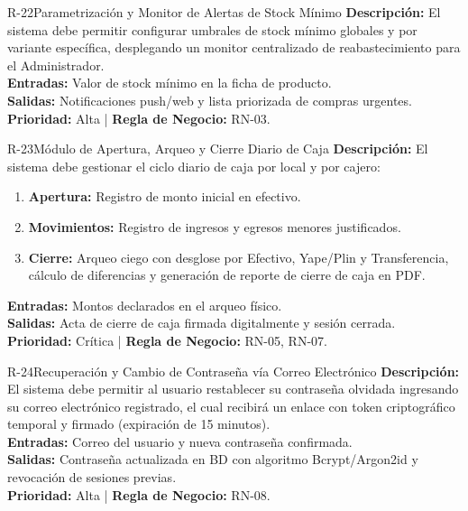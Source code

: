 \begin{reqbox}{R-22}{Parametrización y Monitor de Alertas de Stock Mínimo}
\textbf{Descripción:} El sistema debe permitir configurar umbrales de stock mínimo globales y por variante específica, desplegando un monitor centralizado de reabastecimiento para el Administrador.\\
\textbf{Entradas:} Valor de stock mínimo en la ficha de producto.\\
\textbf{Salidas:} Notificaciones push/web y lista priorizada de compras urgentes.\\
\textbf{Prioridad:} Alta | \textbf{Regla de Negocio:} RN-03.
\end{reqbox}

\begin{reqbox}{R-23}{Módulo de Apertura, Arqueo y Cierre Diario de Caja}
\textbf{Descripción:} El sistema debe gestionar el ciclo diario de caja por local y por cajero:
\begin{enumerate}[noitemsep]
    \item \textbf{Apertura:} Registro de monto inicial en efectivo.
    \item \textbf{Movimientos:} Registro de ingresos y egresos menores justificados.
    \item \textbf{Cierre:} Arqueo ciego con desglose por Efectivo, Yape/Plin y Transferencia, cálculo de diferencias y generación de reporte de cierre de caja en PDF.
\end{enumerate}
\textbf{Entradas:} Montos declarados en el arqueo físico.\\
\textbf{Salidas:} Acta de cierre de caja firmada digitalmente y sesión cerrada.\\
\textbf{Prioridad:} Crítica | \textbf{Regla de Negocio:} RN-05, RN-07.
\end{reqbox}

\begin{reqbox}{R-24}{Recuperación y Cambio de Contraseña vía Correo Electrónico}
\textbf{Descripción:} El sistema debe permitir al usuario restablecer su contraseña olvidada ingresando su correo electrónico registrado, el cual recibirá un enlace con token criptográfico temporal y firmado (expiración de 15 minutos).\\
\textbf{Entradas:} Correo del usuario y nueva contraseña confirmada.\\
\textbf{Salidas:} Contraseña actualizada en BD con algoritmo Bcrypt/Argon2id y revocación de sesiones previas.\\
\textbf{Prioridad:} Alta | \textbf{Regla de Negocio:} RN-08.
\end{reqbox}

